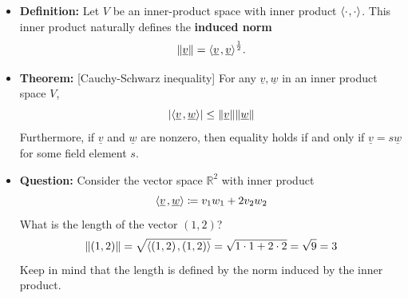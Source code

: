 \documentclass[11pt,twoside]{report}
\newcommand{\bbR}{{\mathbb{R}}}
\newcommand{\vecnot}{\underline}
\newcommand{\inner}[2]{{\left\langle #1 \mskip2mu , #2 \right\rangle}}
\newcommand{\tinner}[2]{{\langle #1 \mskip1mu , #2 \rangle}}
\begin{document}
\begin{itemize}
\begin{itemize}
\end{itemize}



\item \textbf{Definition:} %
Let $V$ be an inner-product space with inner product $\tinner{ \cdot }{ \cdot }$. This inner product naturally defines the \textbf{induced norm} 
\begin{equation*}
\left\| \vecnot{v} \right\| = \inner{ \vecnot{v} }{ \vecnot{v} }^{\frac{1}{2}}.
\end{equation*}

\item \textbf{Theorem:}  [Cauchy-Schwarz inequality]  For any $\vecnot{v}, \vecnot{w}$ in an inner product space $V$, 
\[
\left| \inner{ \vecnot{v} }{ \vecnot{w} } \right| \leq \left\| \vecnot{v} \right\| \left\| \vecnot{w} \right\| 
\]
Furthermore, if $\vecnot{v}$ and $\vecnot{w}$ are nonzero, then equality holds if and only if $\vecnot{v} = s \vecnot{w}$ for some field element $s$. 




\item \textbf{Question:} Consider the vector space $\bbR^2$ with inner product 
\[
\inner{\vecnot{v}}{\vecnot{w}} \coloneqq v_1 w_1 + 2  v_2 w_2
\]
What is the length of the vector $(1,2)$? \\
\[
\| (1,2) \|  = \sqrt{  \inner{ (1,2)}{(1,2)}  }  = \sqrt{  1 \cdot 1 + 2 \cdot 2  }  = \sqrt{9} = 3
\] 
Keep in mind that the length is defined by the norm induced by the inner product. 
\end{itemize}
\end{document}

